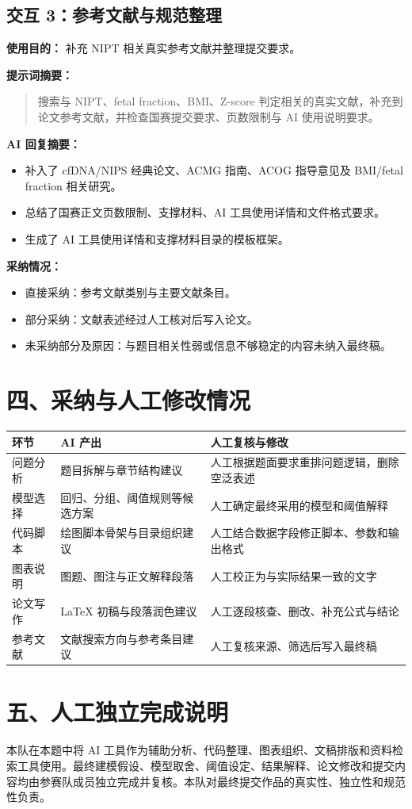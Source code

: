 \documentclass[12pt,a4paper]{article}
\begin{document}
\subsection*{交互 3：参考文献与规范整理}
\textbf{使用目的：} 补充 NIPT 相关真实参考文献并整理提交要求。

\textbf{提示词摘要：}
\begin{quote}
搜索与 NIPT、fetal fraction、BMI、Z-score 判定相关的真实文献，补充到论文参考文献，并检查国赛提交要求、页数限制与 AI 使用说明要求。
\end{quote}

\textbf{AI 回复摘要：}
\begin{itemize}
    \item 补入了 cfDNA/NIPS 经典论文、ACMG 指南、ACOG 指导意见及 BMI/fetal fraction 相关研究。
    \item 总结了国赛正文页数限制、支撑材料、AI 工具使用详情和文件格式要求。
    \item 生成了 AI 工具使用详情和支撑材料目录的模板框架。
\end{itemize}

\textbf{采纳情况：}
\begin{itemize}
    \item 直接采纳：参考文献类别与主要文献条目。
    \item 部分采纳：文献表述经过人工核对后写入论文。
    \item 未采纳部分及原因：与题目相关性弱或信息不够稳定的内容未纳入最终稿。
\end{itemize}

\section*{四、采纳与人工修改情况}
\begin{longtable}{>{\raggedright\arraybackslash}m{3cm} m{4cm} m{6.2cm}}
\toprule
环节 & AI 产出 & 人工复核与修改 \\
\midrule
问题分析 & 题目拆解与章节结构建议 & 人工根据题面要求重排问题逻辑，删除空泛表述 \\
模型选择 & 回归、分组、阈值规则等候选方案 & 人工确定最终采用的模型和阈值解释 \\
代码脚本 & 绘图脚本骨架与目录组织建议 & 人工结合数据字段修正脚本、参数和输出格式 \\
图表说明 & 图题、图注与正文解释段落 & 人工校正为与实际结果一致的文字 \\
论文写作 & \LaTeX{} 初稿与段落润色建议 & 人工逐段核查、删改、补充公式与结论 \\
参考文献 & 文献搜索方向与参考条目建议 & 人工复核来源、筛选后写入最终稿 \\
\bottomrule
\end{longtable}

\section*{五、人工独立完成说明}
本队在本题中将 AI 工具作为辅助分析、代码整理、图表组织、文稿排版和资料检索工具使用。最终建模假设、模型取舍、阈值设定、结果解释、论文修改和提交内容均由参赛队成员独立完成并复核。本队对最终提交作品的真实性、独立性和规范性负责。
\end{document}
